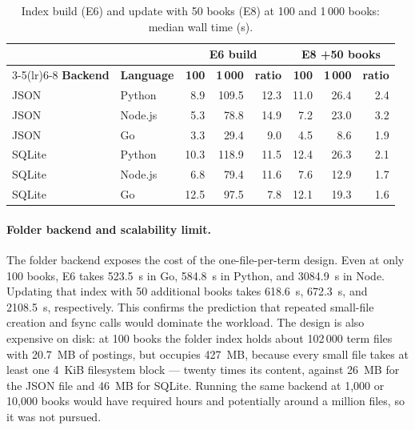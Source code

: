 \documentclass[12pt,a4paper]{article}
\begin{document}
	\begin{table}[H]
		\centering
		\caption{Index build (E6) and update with 50 books (E8) at 100 and 1\,000 books: median wall time (s).}
		\label{tab:scaling}
		\small
		\begin{tabular}{llrrrrrr}
			\toprule
			& & \multicolumn{3}{c}{\textbf{E6 build}} & \multicolumn{3}{c}{\textbf{E8 +50 books}} \\
			\cmidrule(lr){3-5}\cmidrule(lr){6-8}
			\textbf{Backend} & \textbf{Language} & \textbf{100} & \textbf{1\,000} & \textbf{ratio} & \textbf{100} & \textbf{1\,000} & \textbf{ratio} \\
			\midrule
			JSON & Python & 8.9 & 109.5 & 12.3 & 11.0 & 26.4 & 2.4 \\
			JSON & Node.js & 5.3 & 78.8 & 14.9 & 7.2 & 23.0 & 3.2 \\
			JSON & Go & 3.3 & 29.4 & 9.0 & 4.5 & 8.6 & 1.9 \\
			SQLite & Python & 10.3 & 118.9 & 11.5 & 12.4 & 26.3 & 2.1 \\
			SQLite & Node.js & 6.8 & 79.4 & 11.6 & 7.6 & 12.9 & 1.7 \\
			SQLite & Go & 12.5 & 97.5 & 7.8 & 12.1 & 19.3 & 1.6 \\
			\bottomrule
		\end{tabular}
	\end{table}

	\paragraph{Folder backend and scalability limit.}
	The folder backend exposes the cost of the one-file-per-term design. Even at only
	100 books, E6 takes 523.5~s in Go, 584.8~s in Python, and 3084.9~s in Node.
	Updating that index with 50 additional books takes 618.6~s, 672.3~s, and 2108.5~s,
	respectively. This confirms the prediction that repeated small-file creation and fsync
	calls would dominate the workload. The design is also expensive on disk: at 100 books the
	folder index holds about 102\,000 term files with 20.7~MB of postings, but occupies
	427~MB, because every small file takes at least one 4~KiB filesystem block --- twenty
	times its content, against 26~MB for the JSON file and 46~MB for SQLite. Running the same backend at 1,000 or 10,000 books
	would have required hours and potentially around a million files, so it was not pursued.
	
\end{document}
